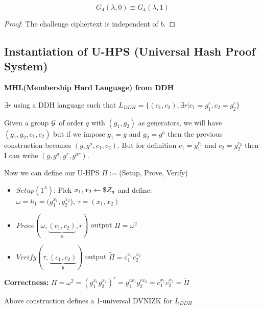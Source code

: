 \begin{lemma}
    \[
        G_{4}(\lambda, 0)\equiv G_{4}(\lambda, 1)   
    \]
\end{lemma}
\begin{proof}
    The challenge ciphertext is independent of $b$.
\end{proof}






\subsection{Instantiation of U-HPS (Universal Hash Proof System)}
\textbf{MHL(Membership Hard Language) from DDH}

$\exists r$ using a DDH language such that $L_{DDH}=\{(c_1,c_2), \exists r | c_1=g_1^r, c_2=g_2^r\}$

Given a group $\mathcal{G}$ of order $q$ with $(g_1,g_2)$ as generators, we will have $(g_1,g_2,c_1,c_2)$ but if we impose $g_1=g$ and $g_2=g^a$ then the previous construction becomes $(g,g^a,c_1,c_2)$. But for definition $c_1=g_1^{r_1}$ and $c_2=g_2^{r_2}$ then I can write $(g,g^a,g^r,g^{ar})$.

Now we can define our U-HPS $\Pi:=$(Setup, Prove, Verify)

\begin{itemize}
    \item $Setup(1^\lambda)$: Pick $x_1,x_2 \leftarrow\$ \mathcal{Z}_q$ and define:\\ $\omega=h_1=(g_1^{x_1},g_2^{x_2}$), $\tau=(x_1,x_2)$
    \item $Prove(\omega, \underbrace{(c_1,c_2)}_{y}, r)$ output $\Pi=\omega^2$
    \item $Verify(\tau, \underbrace{(c_1,c_2)}_{y})$ output $\widetilde{\Pi}=c_1^{x_1}c_2^{x_2}$ %
\end{itemize}

\textbf{Correctness:} $\Pi=\omega^2=(g_1^{x_1}g_2^{x_2})^r=g_1^{rx_1}g_2^{rx_2}=c_1^{x_1}c_2^{x_2}=\widetilde{\Pi}$

\begin{theorem}
    Above construction defines a 1-universal DVNIZK for $L_{DDH}$
\end{theorem}

